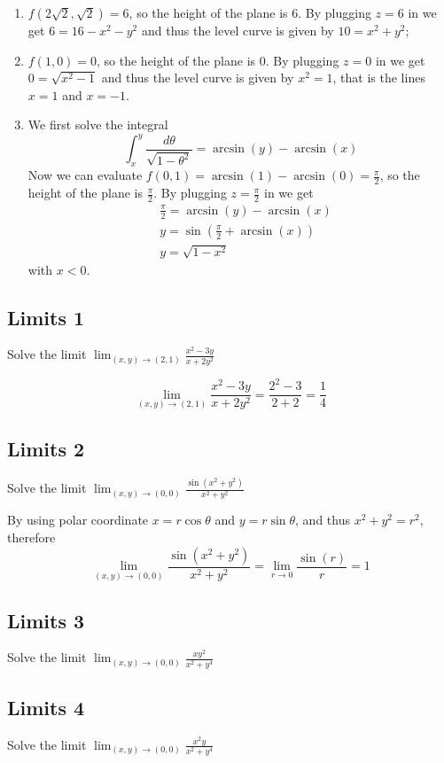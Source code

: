 \documentclass[a4paper]{article}
\begin{document}
\begin{enumerate}
    \item \(f(2\sqrt{2}, \sqrt{2}) = 6\), so the height of the plane is 6.
        By plugging \(z=6\) in we get \(6=16-x^2-y^2\)
        and thus the level curve is given by \(10=x^2+y^2\);
    \item \(f(1, 0) = 0\), so the height of the plane is 0.
        By plugging \(z=0\) in we get \(0 = \sqrt{x^2-1}\)
        and thus the level curve is given by \(x^2=1\), that is
        the lines \(x=1\) and \(x=-1\).
    \item We first solve the integral
    \[ \int_x^y \frac{d\theta}{\sqrt{1-\theta^2}} = \arcsin(y) - \arcsin(x) \]
    Now we can evaluate \(f(0,1) = \arcsin(1) - \arcsin(0) = \frac{\pi}{2}\),
    so the height of the plane is \(\frac{\pi}{2}\).
    By plugging \(z=\frac{\pi}{2}\) in we get
    \begin{align*}
        &\frac{\pi}{2} = \arcsin(y) - \arcsin(x) \\
        &y = \sin\left( \frac{\pi}{2} + \arcsin(x) \right) \\
        &y = \sqrt{1-x^2}
    \end{align*}
    with \(x < 0\).
\end{enumerate}

\subsection{Limits 1}

Solve the limit \(\lim _{(x, y) \rightarrow(2,1)} \frac{x^2-3 y}{x+2 y^2}\)

\[
    \lim _{(x, y) \rightarrow(2,1)} \frac{x^2-3 y}{x+2 y^2}
    = \frac{2^2-3}{2+2} = \frac{1}{4}
\]

\subsection{Limits 2}

Solve the limit \(\lim _{(x, y) \rightarrow(0,0)} \frac{\sin \left(x^2+y^2\right)}{x^2+y^2}\)

By using polar coordinate \(x=r\cos\theta\) and \(y=r\sin\theta\),
and thus \(x^2+y^2=r^2\), therefore
\[
    \lim_{(x, y) \rightarrow(0,0)} \frac{\sin \left(x^2+y^2\right)}{x^2+y^2}
    = \lim_{r \rightarrow 0} \frac{\sin \left(r\right)}{r}=1
\]

\subsection{Limits 3}

Solve the limit \(\lim _{(x, y) \rightarrow(0,0)} \frac{x y^2}{x^2+y^4}\)

\subsection{Limits 4}

Solve the limit \(\lim _{(x, y) \rightarrow(0,0)} \frac{x^2 y}{x^2+y^4}\)
\end{document}

